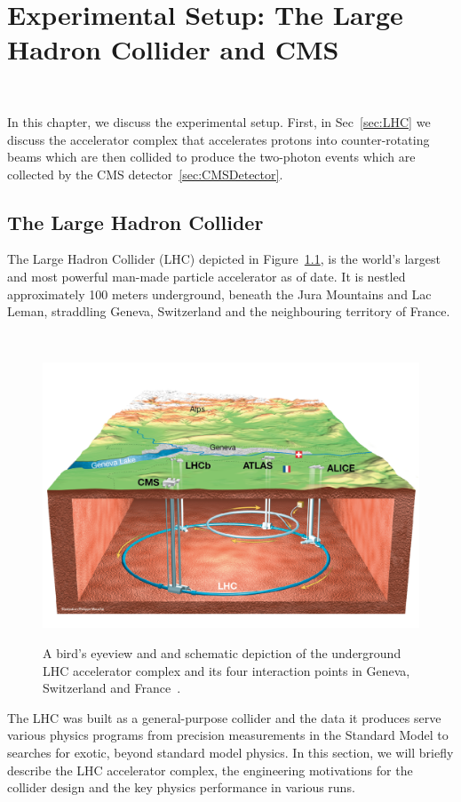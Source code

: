 \chapter{Experimental Setup: The Large Hadron Collider and CMS}~\label{ch:CMSExperiment}

{\small {}
\vspace{-2ex}
}
\vspace{4ex}

In this chapter, we discuss the experimental setup. First, in Sec~\ref{sec:LHC} we discuss the accelerator complex that accelerates protons into counter-rotating beams which are then collided to produce the two-photon events which are collected by the CMS detector~\ref{sec:CMSDetector}. 

\section{The Large Hadron Collider}
\RaggedRight \parindent=25pt
The Large Hadron Collider (LHC) depicted in Figure~\ref{lhc-overview}, is the world's largest and most powerful man-made particle accelerator as of date. It is nestled approximately 100 meters underground, beneath the Jura Mountains and Lac Leman, straddling Geneva, Switzerland and the neighbouring territory of France.

~\label{sec:LHC}
\begin{figure}[!htbp]
	\centering
     \caption{A bird's eyeview and and schematic depiction of the underground LHC accelerator complex and its four interaction points in Geneva, Switzerland and France~\cite{Mouche:1708847}.}
	\includegraphics[scale=0.3]{fig/lhc_overview.png}
	\label{lhc-overview}
\end{figure}
The LHC was built as a general-purpose collider and the data it produces serve various physics programs from precision measurements in the Standard Model to searches for exotic, beyond standard model physics. In this section, we will briefly describe the LHC accelerator complex, the engineering motivations for the collider design and the key physics performance in various runs.


